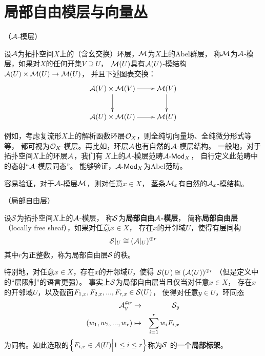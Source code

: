 \section{局部自由模层与向量丛}

\begin{definition}（$\mathcal{A}$-模层）

设$\mathcal{A}$为拓扑空间$X$上的（含幺交换）环层，$\mathcal{M}$为$X$上的Abel群层，
称$\mathcal{M}$为$\mathcal{A}$-模层，如果对$X$的任何开集$V\supseteq U$，
$\mathcal{M}(U)$具有$\mathcal{A}(U)$-模结构$\mathcal{A}(U)\times\mathcal{M}(U)\to\mathcal{M}(U)$，
并且下述图表交换：
$$
  \xymatrix{
     \mcalA(V)\times\mcalM(V)
       \ar[r]
       \ar[d]
    &\mcalM(V)
       \ar[d]
  \\
     \mcalA(U)\times\mcalM(U)
       \ar[r]
    &\mcalM(U)
  }
$$
\end{definition}

例如，考虑复流形$X$上的解析函数环层$\mathcal{O}_X$，则全纯切向量场、全纯微分形式等等，
都可视为$\mathcal{O}_X$-模层。再比如，环层$\mathcal{A}$也有自然的$\mathcal{A}$-模层结构。
一般地，对于拓扑空间$X$上的环层$\mathcal{A}$，我们有
$X$上的$\mathcal{A}$-模层范畴$\mathcal{A}\operatorname{\!\text{-}\mathsf{Mod}}_X$，
自行定义此范畴中的态射“$\mathcal{A}$-模层同态”。
能够验证，$\mathcal{A}\operatorname{\!\text{-}\mathsf{Mod}}_X$为Abel范畴。

容易验证，对于$\mathcal{A}$-模层$\mathcal{M}$，则对任意$x\in X$，
茎条$\mathcal{M}_x$有自然的$\mathcal{A}_x$-模结构。

\begin{definition}（局部自由层）

设$\mathcal{S}$为拓扑空间$X$上的$\mathcal{A}$-模层，
称$\mathcal{S}$为\textbf{局部自由$\mathcal{A}$-模层}，
简称\textbf{局部自由层}（locally free sheaf），如果对任意$x\in X$，
存在$x$的开邻域$U$，使得有层同构
$$\mathcal{S}|_U\cong(\mathcal{A}|_U)^{\oplus r}$$
其中$r$为正整数，称为局部自由层$\mathcal{S}$的秩。
\end{definition}

特别地，对任意$x\in X$，存在$x$的开邻域$U$，使得
$\mathcal{S}(U)\cong(\mathcal{A}(U))^{\oplus r}$
（但是定义中的“层限制”的语言更强）。
事实上$\mathcal{S}$为局部自由层当且仅当对任意$x\in X$，
存在$x$的开邻域$U$，以及截面$F_{1,x},F_{2,x},...,F_{r,x}\in\mathcal{S}(U)$，
使得对任意$y\in U$，环同态
\begin{eqnarray*}
     \mathcal{A}_y^{\oplus r}&\to&\mathcal{S}_y\\
     (w_1,w_2,...,w_r)
&\mapsto&\sum_{i=1}^{r}w_iF_{i,x}
\end{eqnarray*}
为同构。如此选取的$\Big\{ F_{i,x}\in\mathcal{A}(U) \Big| 1\leq i\leq r \Big\}$称为$\mathcal{S}$
的一个\textbf{局部标架}。

